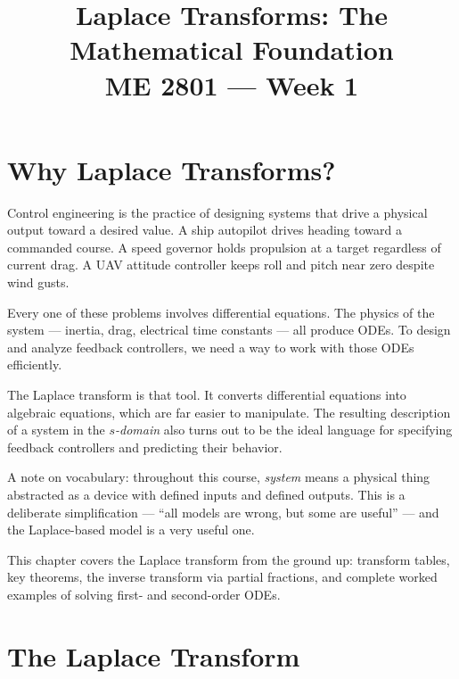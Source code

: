 \documentclass[12pt]{article}
\title{Laplace Transforms: The Mathematical Foundation\\[0.5em]
\large ME 2801 --- Week 1}
\author{}
\date{}
\begin{document}
\maketitle
\tableofcontents
\newpage

\section{Why Laplace Transforms?}
\label{sec:intro}

Control engineering is the practice of designing systems that drive a physical
output toward a desired value.  A ship autopilot drives heading toward a
commanded course.  A speed governor holds propulsion at a target regardless of
current drag.  A UAV attitude controller keeps roll and pitch near zero despite
wind gusts.

Every one of these problems involves differential equations.  The physics of the
system --- inertia, drag, electrical time constants --- all produce ODEs.  To
design and analyze feedback controllers, we need a way to work with those ODEs
efficiently.

The Laplace transform is that tool.  It converts differential equations into
algebraic equations, which are far easier to manipulate.  The resulting
description of a system in the \emph{$s$-domain} also turns out to be the ideal
language for specifying feedback controllers and predicting their behavior.

A note on vocabulary: throughout this course, \emph{system} means a physical
thing abstracted as a device with defined inputs and defined outputs.  This is a
deliberate simplification --- ``all models are wrong, but some are useful'' ---
and the Laplace-based model is a very useful one.

This chapter covers the Laplace transform from the ground up: transform tables,
key theorems, the inverse transform via partial fractions, and complete worked
examples of solving first- and second-order ODEs.

\section{The Laplace Transform}
\label{sec:laplace}
\end{document}
